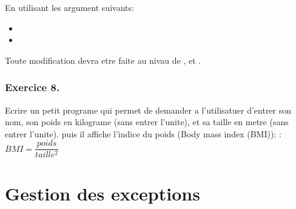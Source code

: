 \documentclass[letterpaper,10pt,french]{sphinxmanual}
\begin{document}
\begin{sphinxVerbatim}[commandchars=\\\{\}]
     
\end{sphinxVerbatim}

\sphinxAtStartPar
En utilisant les argument suivants:
\begin{itemize}
\item {} 
\sphinxAtStartPar
{}

\item {} 
\sphinxAtStartPar
{}

\end{itemize}

\sphinxAtStartPar
Toute modification devra etre faite au nivau de , et .

\begin{sphinxVerbatim}[commandchars=\\\{\}]
\end{sphinxVerbatim}




\subsection{Exercice 8.}
\label{\detokenize{exo4:exercice-8}}
\sphinxAtStartPar
Ecrire un petit programe qui permet de demander a l’utilisatuer d’entrer son nom, son poids en kilograme (sans entrer l’unite), et sa taille en metre (sans entrer l’unite). puis il affiche l’indice du poids (Body mass index (BMI)):
: \(BMI = \dfrac{poids}{taille^2}\)

\begin{sphinxVerbatim}[commandchars=\\\{\}]
\end{sphinxVerbatim}


\chapter{Gestion des exceptions}
\label{\detokenize{content5:gestion-des-exceptions}}\label{\detokenize{content5::doc}}
\end{document}
